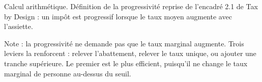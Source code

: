 Calcul arithmétique. Définition de la progressivité reprise de l'encadré 2.1 de Tax by Design : un impôt est progressif lorsque le taux moyen augmente avec l'assiette.\par Note : la progressivité ne demande pas que le taux marginal augmente. Trois leviers la renforcent : relever l'abattement, relever le taux unique, ou ajouter une tranche supérieure. Le premier est le plus efficient, puisqu'il ne change le taux marginal de personne au-dessus du seuil.
